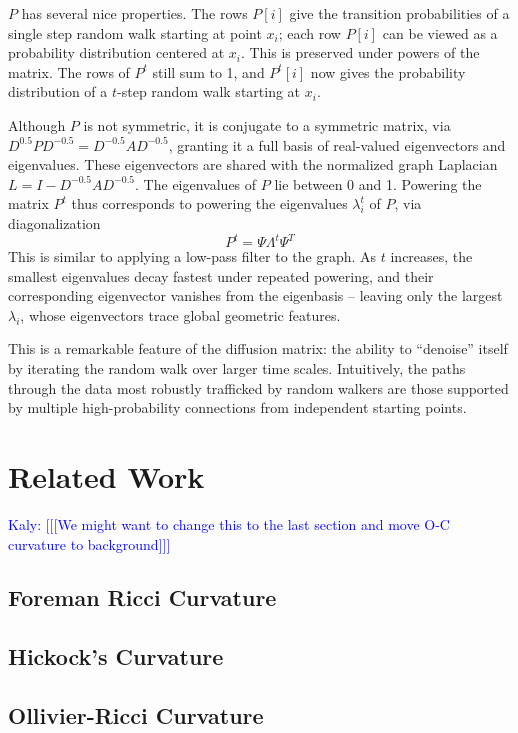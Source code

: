 \documentclass[
  letterpaper,
  DIV=11,
  numbers=noendperiod]{scrartcl}
\theoremstyle{plain}
\theoremstyle{plain}
\theoremstyle{definition}
\theoremstyle{definition}
\theoremstyle{remark}
\newcommand\Kaly[1]{\textcolor{blue}{Kaly: [[[#1]]]}}
\begin{document}
\(P\) has several nice properties. The rows \(P[i]\) give the transition
probabilities of a single step random walk starting at point \(x_{i}\);
each row \(P[i]\) can be viewed as a probability distribution centered
at \(x_{i}\). This is preserved under powers of the matrix. The rows of
\(P^t\) still sum to 1, and \(P^t[i]\) now gives the probability
distribution of a \(t\)-step random walk starting at \(x_{i}\).

Although \(P\) is not symmetric, it is conjugate to a symmetric matrix,
via \(D^{0.5}PD^{-0.5} = D^{-0.5}AD^{-0.5}\), granting it a full basis
of real-valued eigenvectors and eigenvalues. These eigenvectors are
shared with the normalized graph Laplacian
\(L = I - D^{-0.5}AD^{-0.5}\). The eigenvalues of \(P\) lie between 0
and 1. Powering the matrix \(P^t\) thus corresponds to powering the
eigenvalues \(\lambda_{i}^t\) of \(P\), via diagonalization \[
P^t = \Psi \Lambda^t \Psi^T
\] This is similar to applying a low-pass filter to the graph. As \(t\)
increases, the smallest eigenvalues decay fastest under repeated
powering, and their corresponding eigenvector vanishes from the
eigenbasis -- leaving only the largest \(\lambda_{i}\), whose
eigenvectors trace global geometric features.

This is a remarkable feature of the diffusion matrix: the ability to
``denoise'' itself by iterating the random walk over larger time scales.
Intuitively, the paths through the data most robustly trafficked by
random walkers are those supported by multiple high-probability
connections from independent starting points.

\section{Related Work}\label{related-work}
\Kaly{We might want to change this to the last section and move O-C curvature to background}
\subsection{Foreman Ricci Curvature}\label{foreman-ricci-curvature}

\subsection{Hickock's Curvature}\label{hickocks-curvature}

\subsection{Ollivier-Ricci Curvature}\label{ollivier-ricci-curvature}
\end{document}
